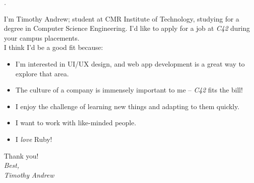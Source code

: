 \documentclass[20pt,a4paper]{moderncv}
\title{{\Colorhref[white]{.}{.}}}               %
\newcommand\myitem{\item[\textbullet] }
\begin{document}
	
\linespread{1.3}

\rmfamily
\fontsize{11.5}{14}
\selectfont
\vspace*{\fill}
{
\begin{center}
\rmfamily
\fontsize{17}{18}
\selectfont
\emph{\color{gray}{Hello}.}\\[15pt]
\end{center}
I'm Timothy Andrew; student at CMR Institute of Technology,
studying for a degree in Computer Science Engineering.
I'd like to apply for a job at \emph{C42} during your campus placements.\\[10pt]
I think I'd be a good fit because:
\begin{itemize}\setlength\itemindent{6pt}
	\myitem I'm interested in UI/UX design, and web app development is a great way to explore that area.
	\myitem The culture of a company is immensely important to me – \emph{C42} fits the bill!
	\myitem I enjoy the challenge of learning new things and adapting to them quickly.
	\myitem I want to work with like-minded people.
	\myitem I \emph{love} Ruby!\\[5pt]
\end{itemize}
Thank you!\\[10pt]
\emph{Best,}
\\[45pt]
\fontsize{15}{15}
\selectfont
{\emph{Timothy Andrew}}

       }
\vspace*{\fill}
\end{document}
